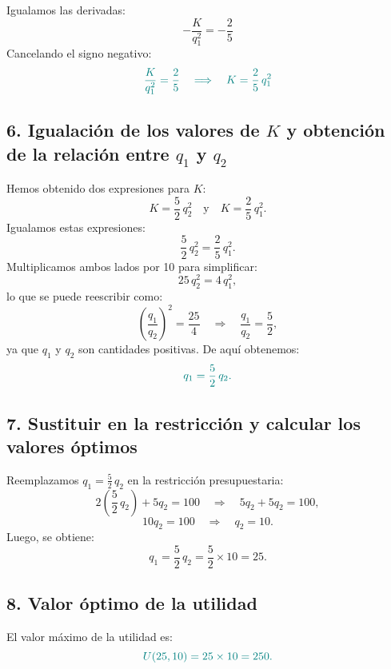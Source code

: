 \documentclass{article}
\begin{document}
Igualamos las derivadas:
\[
-\frac{K}{q_1^2} = -\frac{2}{5}
\]
Cancelando el signo negativo:
\[\color{teal}
\frac{K}{q_1^2} = \frac{2}{5} \quad \Longrightarrow \quad K = \frac{2}{5}\,q_1^2
\]

\subsection*{6. Igualación de los valores de \(K\) y obtención de la relación entre \(q_1\) y \(q_2\)}
Hemos obtenido dos expresiones para \(K\):
\[
K = \frac{5}{2}\,q_2^2 \quad \text{y} \quad K = \frac{2}{5}\,q_1^2.
\]
Igualamos estas expresiones:
\[
\frac{5}{2}\,q_2^2 = \frac{2}{5}\,q_1^2.
\]
Multiplicamos ambos lados por 10 para simplificar:
\[
25\,q_2^2 = 4\,q_1^2,
\]
lo que se puede reescribir como:
\[
\left(\frac{q_1}{q_2}\right)^2 = \frac{25}{4} \quad \Longrightarrow \quad \frac{q_1}{q_2} = \frac{5}{2},
\]
ya que \(q_1\) y \(q_2\) son cantidades positivas. De aquí obtenemos:
\[\color{teal}
q_1 = \frac{5}{2}\,q_2.
\]

\subsection*{7. Sustituir en la restricción y calcular los valores óptimos}
Reemplazamos \(q_1 = \frac{5}{2}\,q_2\) en la restricción presupuestaria:
\[
2\left(\frac{5}{2}\,q_2\right) + 5q_2 = 100 \quad \Longrightarrow \quad 5q_2 + 5q_2 = 100,
\]
\[
10q_2 = 100 \quad \Longrightarrow \quad q_2 = 10.
\]
Luego, se obtiene:
\[
q_1 = \frac{5}{2}\,q_2 = \frac{5}{2} \times 10 = 25.
\]

\subsection*{8. Valor óptimo de la utilidad}
El valor máximo de la utilidad es:
\[\color{teal}
U(25,10) = 25 \times 10 = 250.
\]
\end{document}
